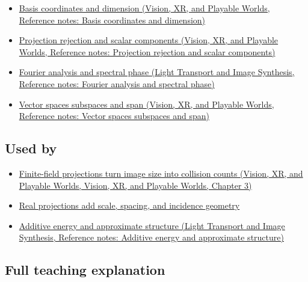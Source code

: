 \begin{itemize}
\tightlist
\item
  \href{../07-Vision-XR-and-Playable-Worlds/main.pdf\#nameddest=appendix-ce0341f7ea0d}{Basis coordinates and dimension (Vision, XR, and Playable Worlds, Reference notes: Basis coordinates and dimension)}
\item
  \href{../07-Vision-XR-and-Playable-Worlds/main.pdf\#nameddest=appendix-505a502c372a}{Projection rejection and scalar components (Vision, XR, and Playable Worlds, Reference notes: Projection rejection and scalar components)}
\item
  \href{../04-Light-Transport-and-Image-Synthesis/main.pdf\#nameddest=appendix-b60686ba06a1}{Fourier analysis and spectral phase (Light Transport and Image Synthesis, Reference notes: Fourier analysis and spectral phase)}
\item
  \href{../07-Vision-XR-and-Playable-Worlds/main.pdf\#nameddest=appendix-173b52c063ae}{Vector spaces subspaces and span (Vision, XR, and Playable Worlds, Reference notes: Vector spaces subspaces and span)}
\end{itemize}

\subsection{Used by}\label{appendix-3c73f7862157-used-by}

\begin{itemize}
\tightlist
\item
  \href{../07-Vision-XR-and-Playable-Worlds/main.pdf\#nameddest=04-visual-computing-ii-ch032-finite-field-projections-turn-image-size-into-collision-counts}{Finite-field projections turn image size into collision counts (Vision, XR, and Playable Worlds, Vision, XR, and Playable Worlds, Chapter 3)}
\item
  \hyperref[04-visual-computing-ii-ch033-real-projections-add-scale-spacing-and-incidence-geometry]{Real projections add scale, spacing, and incidence geometry}
\item
  \href{../04-Light-Transport-and-Image-Synthesis/main.pdf\#nameddest=appendix-b0732b22e7d6}{Additive energy and approximate structure (Light Transport and Image Synthesis, Reference notes: Additive energy and approximate structure)}
\end{itemize}

\subsection{Full teaching explanation}\label{appendix-3c73f7862157-full-teaching-explanation}


